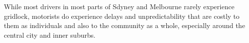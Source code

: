 \documentclass{article}
\begin{document}
While most drivers in most parts of Sdyney and Melbourne rarely experience gridlock, motorists do experience delays and unpredictability that are costly to them as individuals and also to the community as a whole, especially around the central city and inner suburbs.
\end{document}
